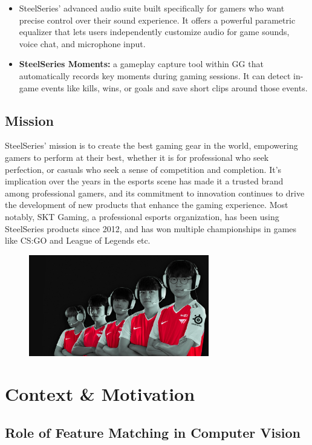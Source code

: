 \documentclass[a4paper,12pt]{report}
\begin{document}
\begin{itemize}
\begin{itemize}
        \item SteelSeries' advanced audio suite built specifically for gamers who want precise control over their sound experience. It offers a powerful parametric equalizer that lets users independently customize audio for game sounds, voice chat, and microphone input.
        \item \textbf{SteelSeries Moments:} a gameplay capture tool within GG that automatically records key moments during gaming sessions. It can detect in-game events like kills, wins, or goals and save short clips around those events.
        \end{itemize} 
\end{itemize}

\subsection{Mission}
SteelSeries' mission is to create the best gaming gear in the world, empowering gamers to perform at their best, whether it is for professional who seek perfection, or casuals who seek a sense of competition and completion. It's implication over the years in the esports scene has made it a trusted brand among professional gamers, and its commitment to innovation continues to drive the development of new products that enhance the gaming experience. Most notably, SKT Gaming, a professional esports organization, has been using SteelSeries products since 2012, and has won multiple championships in games like CS:GO and League of Legends etc.
\begin{figure}[h!]
    \centering
    \includegraphics[width=0.7\textwidth]{ressources/sktt1.png}
    \caption{}
    \label{fig:}
\end{figure}
\section{Context \& Motivation}
\subsection{Role of Feature Matching in Computer Vision}
\end{document}
